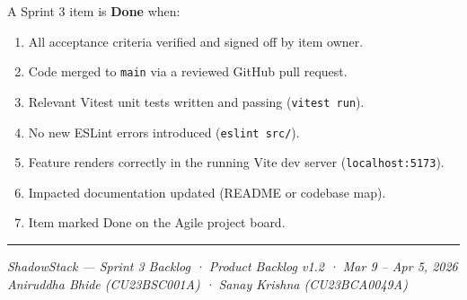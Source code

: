 \documentclass[10pt,a4paper]{article}
\begin{document}
A Sprint 3 item is \textbf{Done} when:
\begin{enumerate}[leftmargin=1.8em, itemsep=2pt]
  \item All acceptance criteria verified and signed off by item owner.
  \item Code merged to \texttt{main} via a reviewed GitHub pull request.
  \item Relevant Vitest unit tests written and passing (\texttt{vitest run}).
  \item No new ESLint errors introduced (\texttt{eslint src/}).
  \item Feature renders correctly in the running Vite dev server (\texttt{localhost:5173}).
  \item Impacted documentation updated (README or codebase map).
  \item Item marked Done on the Agile project board.
\end{enumerate}

\vspace{1.5em}
\hrule
\vspace{0.5em}
\begin{center}
\textit{ShadowStack — Sprint 3 Backlog · Product Backlog v1.2 · Mar 9 – Apr 5, 2026}\\
\textit{Aniruddha Bhide (CU23BSC001A) · Sanay Krishna (CU23BCA0049A)}
\end{center}
\end{document}
